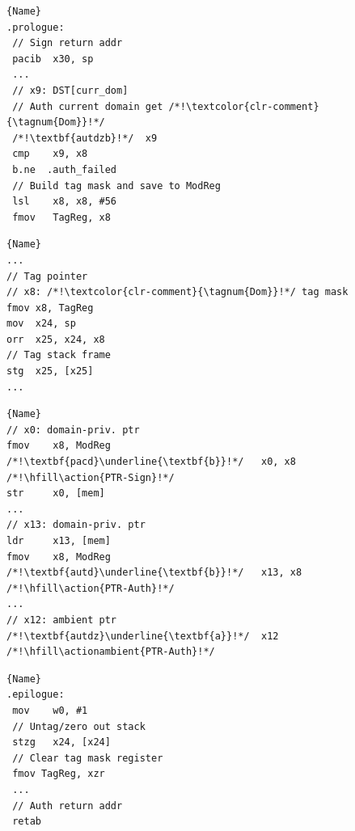 \begin{figure}[t]
	\centering
	\noindent\begin{minipage}[t]{.45\textwidth}
		\begin{lstlisting}[style=sslab-capacity-c,language={[ARM]Assembler},keepspaces,numbers=none]{Name}
.prologue:
 // Sign return addr
 pacib  x30, sp 
 ... 
 // x9: DST[curr_dom]
 // Auth current domain get /*!\textcolor{clr-comment}{\tagnum{Dom}}!*/
 /*!\textbf{autdzb}!*/	x9    
 cmp    x9, x8 
 b.ne  .auth_failed
 // Build tag mask and save to ModReg
 lsl    x8, x8, #56 
 fmov   TagReg, x8
\end{lstlisting}
	\end{minipage}\hfill
	\noindent\begin{minipage}[t]{.45\textwidth}
		\begin{lstlisting}[style=sslab-capacity-c,language={[ARM]Assembler},keepspaces,numbers=none]{Name}
...
// Tag pointer
// x8: /*!\textcolor{clr-comment}{\tagnum{Dom}}!*/ tag mask 
fmov x8, TagReg
mov  x24, sp
orr	 x25, x24, x8 
// Tag stack frame
stg	 x25, [x25]  
...

\end{lstlisting}
	\end{minipage}\hfill

\begin{minipage}[t]{.45\textwidth}
		\label{fig:asm-prologue}
	\end{minipage}\hfill
	\begin{minipage}[t]{.45\textwidth}
		\label{fig:asm-stack-tagging}
	\end{minipage}\hfill
 
	\noindent\begin{minipage}[t]{.45\textwidth}
		\begin{lstlisting}[style=sslab-capacity-c,language={[ARM]Assembler},keepspaces,numbers=none]{Name}
// x0: domain-priv. ptr
fmov    x8, ModReg  
/*!\textbf{pacd}\underline{\textbf{b}}!*/   x0, x8   /*!\hfill\action{PTR-Sign}!*/
str	    x0, [mem] 
...
// x13: domain-priv. ptr
ldr     x13, [mem]
fmov    x8, ModReg
/*!\textbf{autd}\underline{\textbf{b}}!*/   x13, x8 /*!\hfill\action{PTR-Auth}!*/
... 
// x12: ambient ptr
/*!\textbf{autdz}\underline{\textbf{a}}!*/  x12   /*!\hfill\actionambient{PTR-Auth}!*/
\end{lstlisting}
	\end{minipage}\hfill
	\noindent\begin{minipage}[t]{.45\textwidth}
		\begin{lstlisting}[style=sslab-capacity-c,language={[ARM]Assembler},keepspaces,numbers=none]{Name}
.epilogue:
 mov	w0, #1
 // Untag/zero out stack 
 stzg	x24, [x24]
 // Clear tag mask register
 fmov TagReg, xzr
 ...
 // Auth return addr
 retab
\end{lstlisting}
	\end{minipage}
	

\end{figure}
